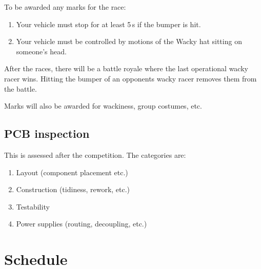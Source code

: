 \documentclass[11pt, a4paper]{article}
\begin{document}

To be awarded any marks for the race:
%
\begin{enumerate}
\item Your vehicle must stop for at least 5\,s if the bumper is hit.

\item Your vehicle must be controlled by motions of the Wacky hat
  sitting on someone's head.
\end{enumerate}

After the races, there will be a battle royale where the last
operational wacky racer wins.  Hitting the bumper of an opponents
wacky racer removes them from the battle.

Marks will also be awarded for wackiness, group costumes, etc.


\subsection{PCB inspection}

This is assessed after the competition.  The categories are:
%
\begin{enumerate}
\item Layout (component placement etc.)
\item Construction (tidiness, rework, etc.)
\item Testability
\item Power supplies (routing, decoupling, etc.)
\end{enumerate}


\vfill\pagebreak
\section{Schedule}
\end{document}

